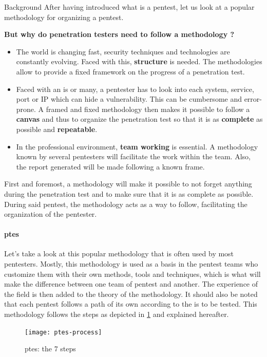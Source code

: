 \begin{chaptercover}{Background}
After having introduced what is a pentest, let us look at a popular methodology for organizing a pentest.

\begin{question}
\textbf{But why do penetration testers need to follow a methodology ?}
\begin{itemize}
  \item The world is changing fast, security techniques and technologies are constantly evolving. Faced with this, \textbf{structure} is needed. The methodologies allow to provide a fixed framework on the progress of a penetration test.
  \item Faced with an \acrshort{is} or many, a pentester has to look into each system, service, port or IP which can hide a vulnerability. This can be cumbersome and error-prone. A framed and fixed methodology then makes it possible to follow a \textbf{canvas} and thus to organize the penetration test so that it is as \textbf{complete} as possible and \textbf{repeatable}.
  \item In the professional environment, \textbf{team working} is essential. A methodology known by several pentesters will facilitate the work within the team. Also, the report generated will be made following a known frame.
\end{itemize}
\end{question}

First and foremost, a methodology will make it possible to not forget anything during the penetration test and to make sure that it is as complete as possible. During said pentest, the methodology acts as a way to follow, facilitating the organization of the pentester.

\paragraph{\acrfull{ptes} \cite{ptes}} Let's take a look at this popular methodology that is often used by most pentesters. Mostly, this methodology is used as a basis in the pentest teams who customize them with their own methods, tools and techniques, which is what will make the difference between one team of pentest and another. The experience of the field is then added to the theory of the methodology. It should also be noted that each pentest follows a path of its own according to the \acrshort{is} to be tested. This methodology follows the steps as depicted in \ref{fig:ptes-process} and explained hereafter.

\begin{figure}[H]
  \centering
  \texttt{[image: ptes-process]}
  \caption{\acrshort{ptes}: the 7 steps}
  \label{fig:ptes-process}
\end{figure}


\end{chaptercover}
